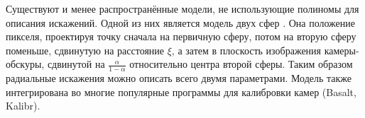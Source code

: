 Существуют и менее распространённые модели, не использующие полиномы для описания искажений. Одной из них является
модель двух сфер \cite{double_sphere}. %
Она положение пикселя, проектируя точку сначала на первичную сферу, потом на вторую сферу поменьше, сдвинутую на 
расстояние $\xi$, а затем в плоскость изображения камеры-обскуры, сдвинутой на $\frac{\alpha}{1-\alpha}$ относительно 
центра второй сферы. Таким образом радиальные искажения можно описать всего двумя параметрами. Модель также интегрирована
во многие популярные программы для калибровки камер (Basalt, Kalibr).


 